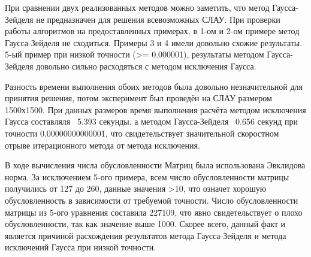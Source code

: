 \documentclass[a4paper]{article}
\begin{document}
При сравнении двух реализованных методов можно заметить, что метод Гаусса-Зейделя не предназначен для решения всевозможных СЛАУ. 
При проверки работы алгоритмов на предоставленных примерах, в 1-ом и 2-ом примере метод Гаусса-Зейделя не сходиться. Примеры 3 и 4 имели довольно схожие результаты.
5-ый пример при низкой точности (>= 0.000001), результаты методом Гаусса-Зейделя довольно сильно расходяться с методом исключения Гаусса. 

Разность времени выполнения обоих методов была довольно незначительной для принятия решения, потом эксперимент был проведён на СЛАУ размером 1500х1500. 
При данных размеров время выполнения расчёта методом исключения Гаусса составляля ~5.393 секунды, а методом Гаусса-Зейделя ~0.656 секунд при точности 0.00000000000001, 
что свидетельствует значительной скоростном отрыве итерационного метода от метода исключения.

В ходе вычисления числа обусловленности Матриц была использована Эвклидова норма. За исключением 5-ого примера, всем число обусловленности матрицы получились от 127 до 260,
данные значения >10, что означет хорошую обусловленность в зависимости от требуемой точности. Число обусловленности матрицы из 5-ого уравнения составила 227109, 
что явно свидетельствует о плохо обусловленности, так как значение выше 1000. Скорее всего, данный факт и является причиной расхождения результатов 
метода Гаусса-Зейделя и метода исключений Гаусса при низкой точности.
\end{document}
